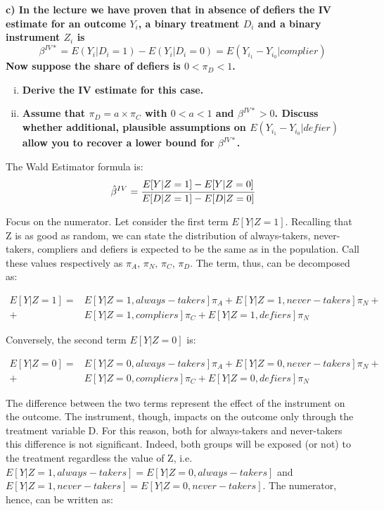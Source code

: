 \documentclass[a4paper,12pt,oneside,English]{article}
\begin{document}
\textbf{c) In the lecture we have proven that in absence of defiers the IV estimate for an outcome $Y_i$, a binary treatment $D_i$ and a binary instrument $Z_i$ is
\begin{equation}
    \beta^{IV*} = E(Y_i|D_i = 1) - E(Y_i|D_i = 0) = E(Y_i_1 - Y_i_0|complier)
\end{equation}
Now suppose the share of defiers is $0 < \pi_D < 1$.}
\begin{enumerate}[i)]
    \item \textbf{Derive the IV estimate for this case.}
    \item \textbf{Assume that $\pi_D = a × \pi_C$ with $0 < a < 1$ and $\beta^{IV*}> 0$. Discuss whether additional, plausible assumptions on $E(Y_i_1 - Y_i_0|defier)$ allow you to recover a lower bound for $\beta^{IV*}$.}
\end{enumerate}

The Wald Estimator formula is:
\[
\hat\beta^{IV}=\cfrac{E[Y|Z=1]-E[Y|Z=0]}{E[D|Z=1]-E[D|Z=0]}
\]

Focus on the numerator. Let consider the first term $E[Y|Z=1]$. Recalling that Z is as good as random, we can state the distribution of always-takers, never-takers, compliers and defiers is expected to be the same as in the population. Call these values respectively as $\pi_A,\,\pi_N,\,\pi_C,\,\pi_D$. The term, thus, can be decomposed as:

\[
\begin{split}
    E[Y|Z=1]=&E[Y|Z=1, always-takers]\pi_A+E[Y|Z=1, never-takers]\pi_N+\\
    +&E[Y|Z=1, compliers]\pi_C+E[Y|Z=1, defiers]\pi_N
\end{split}
\]

Conversely, the second term $E[Y|Z=0]$ is:

\[
\begin{split}
    E[Y|Z=0]=&E[Y|Z=0, always-takers]\pi_A+E[Y|Z=0, never-takers]\pi_N+\\
    +&E[Y|Z=0, compliers]\pi_C+E[Y|Z=0, defiers]\pi_N
\end{split}
\]

The difference between the two terms represent the effect of the instrument on the outcome. The instrument, though, impacts on the outcome only through the treatment variable D. For this reason, both for always-takers and never-takers this difference is not significant. Indeed, both groups will be exposed (or not) to the treatment regardless the value of Z, i.e. $E[Y|Z=1,always-takers]=E[Y|Z=0,always-takers]$ and $E[Y|Z=1,never-takers]=E[Y|Z=0,never-takers]$. The numerator, hence, can be written as:
\end{document}
